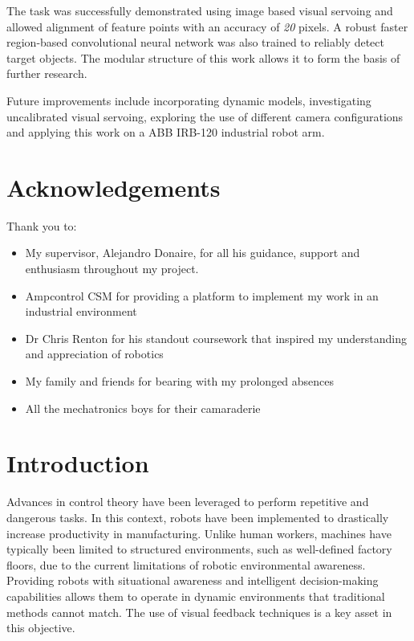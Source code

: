 \documentclass{UoNMCHA}
\numberwithin{equation}{section}
\begin{document}
The task was successfully demonstrated using image based visual servoing and allowed alignment of feature points with an accuracy of \textit{20} pixels.
A robust faster region-based convolutional neural network was also trained to reliably detect target objects. The modular structure of this work allows it to form the basis of further research. \ 

Future improvements include incorporating dynamic models, investigating uncalibrated visual servoing, exploring the use of different camera configurations and applying this work on a ABB IRB-120 industrial robot arm.

\newpage
\vspace{-2mm}
\section*{Acknowledgements}

Thank you to:
\begin{itemize}
	\item My supervisor, Alejandro Donaire, for all his guidance, support and enthusiasm throughout my project.
	\item Ampcontrol CSM for providing a platform to implement my work in an industrial environment
	\item Dr Chris Renton for his standout coursework that inspired my understanding and appreciation of robotics
	\item My family and friends for bearing with my prolonged absences
	\item All the mechatronics boys for their camaraderie
	
\end{itemize}

\newpage
\tableofcontents
\listoffigures
\listoftables
\newpage
\section{Introduction}

Advances in control theory have been leveraged to perform repetitive and dangerous tasks. In this context, robots have been implemented to drastically increase productivity in manufacturing. Unlike human workers, machines have typically been limited to structured environments, such as well-defined factory floors, due to the current limitations of robotic environmental awareness. Providing robots with situational awareness and intelligent decision-making capabilities allows them to operate in dynamic environments that traditional methods cannot match.  The use of visual feedback techniques is a key asset in this objective. \
\end{document}
